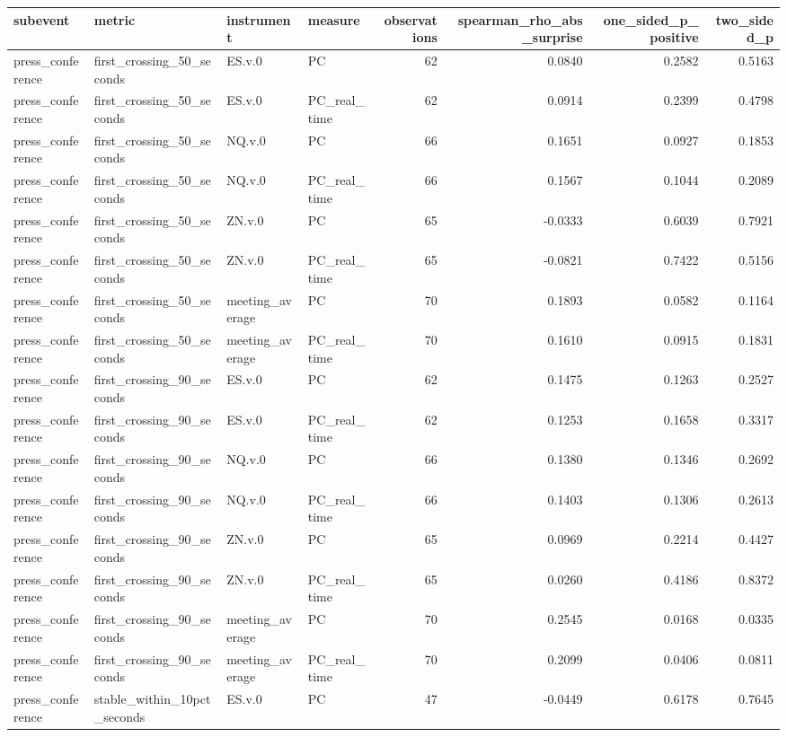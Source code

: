 \begin{tabular}{llllrrrr}
\toprule
subevent & metric & instrument & measure & observations & spearman_rho_abs_surprise & one_sided_p_positive & two_sided_p \\
\midrule
press_conference & first_crossing_50_seconds & ES.v.0 & PC & 62 & 0.0840 & 0.2582 & 0.5163 \\
press_conference & first_crossing_50_seconds & ES.v.0 & PC_real_time & 62 & 0.0914 & 0.2399 & 0.4798 \\
press_conference & first_crossing_50_seconds & NQ.v.0 & PC & 66 & 0.1651 & 0.0927 & 0.1853 \\
press_conference & first_crossing_50_seconds & NQ.v.0 & PC_real_time & 66 & 0.1567 & 0.1044 & 0.2089 \\
press_conference & first_crossing_50_seconds & ZN.v.0 & PC & 65 & -0.0333 & 0.6039 & 0.7921 \\
press_conference & first_crossing_50_seconds & ZN.v.0 & PC_real_time & 65 & -0.0821 & 0.7422 & 0.5156 \\
press_conference & first_crossing_50_seconds & meeting_average & PC & 70 & 0.1893 & 0.0582 & 0.1164 \\
press_conference & first_crossing_50_seconds & meeting_average & PC_real_time & 70 & 0.1610 & 0.0915 & 0.1831 \\
press_conference & first_crossing_90_seconds & ES.v.0 & PC & 62 & 0.1475 & 0.1263 & 0.2527 \\
press_conference & first_crossing_90_seconds & ES.v.0 & PC_real_time & 62 & 0.1253 & 0.1658 & 0.3317 \\
press_conference & first_crossing_90_seconds & NQ.v.0 & PC & 66 & 0.1380 & 0.1346 & 0.2692 \\
press_conference & first_crossing_90_seconds & NQ.v.0 & PC_real_time & 66 & 0.1403 & 0.1306 & 0.2613 \\
press_conference & first_crossing_90_seconds & ZN.v.0 & PC & 65 & 0.0969 & 0.2214 & 0.4427 \\
press_conference & first_crossing_90_seconds & ZN.v.0 & PC_real_time & 65 & 0.0260 & 0.4186 & 0.8372 \\
press_conference & first_crossing_90_seconds & meeting_average & PC & 70 & 0.2545 & 0.0168 & 0.0335 \\
press_conference & first_crossing_90_seconds & meeting_average & PC_real_time & 70 & 0.2099 & 0.0406 & 0.0811 \\
press_conference & stable_within_10pct_seconds & ES.v.0 & PC & 47 & -0.0449 & 0.6178 & 0.7645 \\

\end{tabular}
